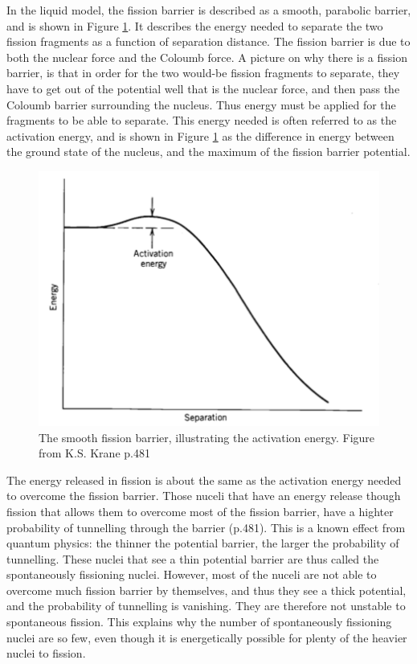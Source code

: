\documentclass[]{article}
\begin{document}
 \noindent In the liquid model, the fission barrier is described as a smooth, parabolic barrier, and is shown in Figure \ref{fig:smooth_fission_barrier}. It describes the energy needed to separate the two fission fragments as a function of separation distance. The fission barrier is due to both the nuclear force and the Coloumb force. A picture on why there is a fission barrier, is that in order for the two would-be fission fragments to separate, they have to get out of the potential well that is the nuclear force, and then pass the Coloumb barrier surrounding the nucleus. Thus energy must be applied for the fragments to be able to separate. This energy needed is often referred to as the activation energy, and is shown in Figure \ref{fig:smooth_fission_barrier} as the difference in energy between the ground state of the nucleus, and the maximum of the fission barrier potential. 
 
 \par
 \vspace{3mm}
 
 \begin{figure}
 	\centering
 	\includegraphics[scale=0.7]{smooth_fission_barrier.png}
 	\caption{The smooth fission barrier, illustrating the activation energy. Figure from K.S. Krane p.481 \cite{Krane1988}}
 	\label{fig:smooth_fission_barrier}
 \end{figure}

\noindent The energy released in fission is about the same as the activation energy needed to overcome the fission barrier. Those nuceli that have an energy release though fission that allows them to overcome most of the fission barrier, have a highter probability of tunnelling through the barrier \cite{Krane1988} (p.481). This is a known effect from quantum physics: the thinner the potential barrier, the larger the probability of tunnelling. These nuclei that see a thin potential barrier are thus called the spontaneously fissioning nuclei. However, most of the nuceli are not able to overcome much fission barrier by themselves, and thus they see a thick potential, and the probability of tunnelling is vanishing. They are therefore not unstable to spontaneous fission. This explains why the number of spontaneously fissioning nuclei are so few, even though it is energetically possible for plenty of the heavier nuclei to fission.
\end{document}
